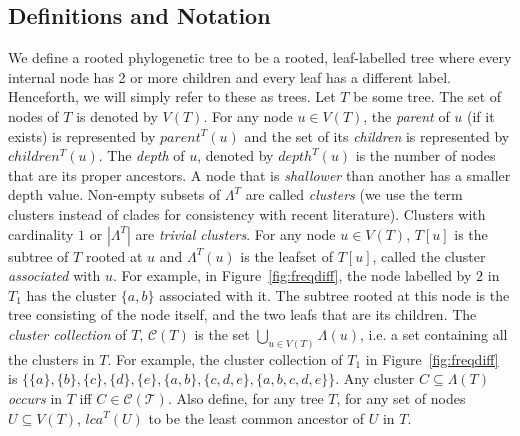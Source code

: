 \documentclass{article}
\newcommand{\leafset}{\Lambda}
\begin{document}
    \subsection{Definitions and Notation}
    \label{subsec:def}

    We define a rooted phylogenetic tree to be a rooted, leaf-labelled tree where every internal node has 2 or more children and every leaf has a different label. Henceforth, we will simply refer to these as trees. Let $T$ be some tree. The set of nodes of $T$ is denoted by $V(T)$. For any node $u \in V(T)$, the \textit{parent} of $u$ (if it exists) is represented by $parent^T(u)$ and the set of its \textit{children} is represented by $children^T(u)$. The \textit{depth} of $u$, denoted by $depth^T(u)$ is the number of nodes that are its proper ancestors. A node that is \textit{shallower} than another has a smaller depth value. Non-empty subsets of $\leafset^T$ are called \textit{clusters} (we use the term clusters instead of clades for consistency with recent literature). Clusters with cardinality $1$ or $|\leafset^T|$ are \textit{trivial clusters}. For any node $u \in V(T)$, $T[u]$ is the subtree of $T$ rooted at $u$ and $\leafset^T(u)$ is the leafset of $T[u]$, called the cluster \textit{associated} with $u$. For example, in Figure~\ref{fig:freqdiff}, the node labelled by $2$ in $T_1$ has the cluster $\{a, b\}$ associated with it. The subtree rooted at this node is the tree consisting of the node itself, and the two leafs that are its children. The \textit{cluster collection} of $T$, $\mathcal{C}(T)$ is the set $\bigcup_{u \in V(T)} {\leafset(u)}$, i.e. a set containing all the clusters in $T$. For example, the cluster collection of $T_1$ in Figure~\ref{fig:freqdiff} is $\{\{a\}, \{b\}, \{c\}, \{d\}, \{e\}, \{a, b\}, \{c, d, e\}, \{a, b, c, d, e\}\}$. Any cluster $C \subseteq \leafset(T)$ \textit{occurs} in $T$ iff $C \in \mathcal{C(T)}$. Also define, for any tree $T$, for any set of nodes $U \subseteq V(T)$, $lca^T(U)$ to be the least common ancestor of $U$ in $T$.
\end{document}
